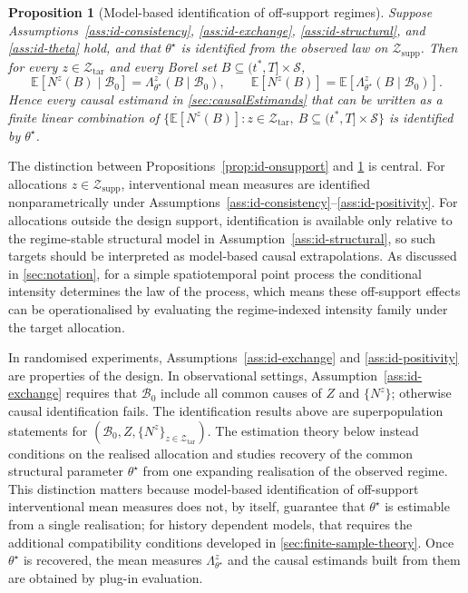 \documentclass{statsoc}
\newtheorem{proposition}[proposition]{Proposition}
\newcommand{\bbE}{\mathbb{E}}
\newcommand{\1}{\mathbbm{1}}
\newcommand{\Nproc}{N}
\begin{document}
\begin{proposition}[Model-based identification of off-support regimes]\label{prop:id-offsupport}
Suppose Assumptions~\ref{ass:id-consistency}, \ref{ass:id-exchange}, \ref{ass:id-structural}, and \ref{ass:id-theta} hold, and that \(\theta^\star\) is identified from the observed law on \(\mathcal Z_{\mathrm{supp}}\). Then for every \(z\in\mathcal Z_{\mathrm{tar}}\) and every Borel set \(B\subseteq (t^\ast,T]\times\mathcal S\),
\[
\bbE\!\left[\Nproc^z(B)\mid \mathcal B_0\right]
=
\Lambda_{\theta^\star}^z(B\mid \mathcal B_0),
\qquad
\bbE\!\left[\Nproc^z(B)\right]
=
\bbE\!\left[\Lambda_{\theta^\star}^z(B\mid \mathcal B_0)\right].
\]
Hence every causal estimand in \cref{sec:causalEstimands} that can be written as a finite linear combination of \(\{\bbE[\Nproc^z(B)]: z\in\mathcal Z_{\mathrm{tar}},\ B\subseteq (t^\ast,T]\times\mathcal S\}\) is identified by \(\theta^\star\).
\end{proposition}

The distinction between Propositions~\ref{prop:id-onsupport} and \ref{prop:id-offsupport} is central. For allocations \(z\in\mathcal Z_{\mathrm{supp}}\), interventional mean measures are identified nonparametrically under Assumptions~\ref{ass:id-consistency}--\ref{ass:id-positivity}. For allocations outside the design support, identification is available only relative to the regime-stable structural model in Assumption~\ref{ass:id-structural}, so such targets should be interpreted as model-based causal extrapolations. As discussed in \cref{sec:notation}, for a simple spatiotemporal point process the conditional intensity determines the law of the process, which means these off-support effects can be operationalised by evaluating the regime-indexed intensity family under the target allocation.

In randomised experiments, Assumptions~\ref{ass:id-exchange} and \ref{ass:id-positivity} are properties of the design. In observational settings, Assumption~\ref{ass:id-exchange} requires that \(\mathcal B_0\) include all common causes of \(Z\) and \(\{\Nproc^z\}\); otherwise causal identification fails. The identification results above are superpopulation statements for \((\mathcal B_0,Z,\{\Nproc^z\}_{z\in\mathcal Z_{\mathrm{tar}}})\). 
The estimation theory below instead conditions on the realised allocation and studies recovery of the common structural parameter \(\theta^\star\) from one expanding realisation of the observed regime.  This distinction matters because model-based identification of off-support interventional mean measures does not, by itself, guarantee that \(\theta^\star\) is estimable from a single realisation; for history dependent models, that requires the additional compatibility conditions developed in \cref{sec:finite-sample-theory}.  Once \(\theta^\star\) is recovered, the mean measures \(\Lambda_{\theta^\star}^z\) and the causal estimands built from them are obtained by plug-in evaluation.
\end{document}
